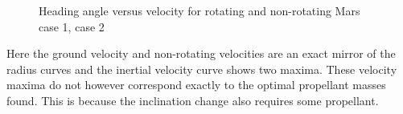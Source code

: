 \begin{figure}[H]
\centering
{} 
\caption{Heading angle versus velocity for rotating and non-rotating Mars \protect{} case 1,  \protect{} case 2 } 
\label{fig:headingAngleVsVelocityCase1combined} 
\end{figure}

\noindent
Here the ground velocity and non-rotating velocities are an exact mirror of the radius curves and the inertial velocity curve shows two maxima. These velocity maxima do not however correspond exactly to the optimal propellant masses found. This is because the inclination change also requires some propellant.

%

